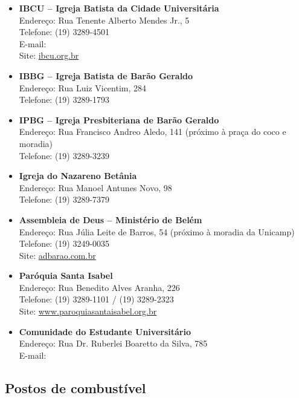 \begin{itemize}
\item   \textbf{IBCU -- Igreja Batista da Cidade Universitária}
		\\Endereço: Rua Tenente Alberto Mendes Jr., 5
		\\Telefone: (19) 3289-4501
		\\E-mail: 
		\\Site: \url{ibcu.org.br}

\item   \textbf{IBBG -- Igreja Batista de Barão Geraldo}
		\\Endereço: Rua Luiz Vicentim, 284
		\\Telefone: (19) 3289-1793

\item   \textbf{IPBG -- Igreja Presbiteriana de Barão Geraldo}
		\\Endereço: Rua Francisco Andreo Aledo, 141 (próximo à praça do coco e moradia)
		\\Telefone: (19) 3289-3239

\item   \textbf{Igreja do Nazareno Betânia}
		\\Endereço: Rua Manoel Antunes Novo, 98
		\\Telefone: (19) 3289-7379

\item   \textbf{Assembleia de Deus -- Ministério de Belém}
		\\Endereço: Rua Júlia Leite de Barros, 54 (próximo à moradia da Unicamp)
		\\Telefone: (19) 3249-0035
		\\Site: \url{adbarao.com.br}

\item   \textbf{Paróquia Santa Isabel}
		\\Endereço: Rua Benedito Alves Aranha, 226
		\\Telefone: (19) 3289-1101 / (19) 3289-2323
		\\Site: \url{www.paroquiasantaisabel.org.br}

\item   \textbf{Comunidade do Estudante Universitário}
		\\Endereço: Rua Dr. Ruberlei Boaretto da Silva, 785
		\\E-mail: 
\end{itemize}

\subsection{Postos de combustível}

